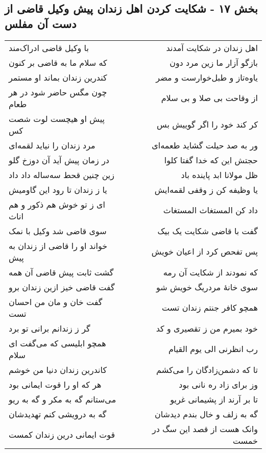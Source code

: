 \begin{center}
\section*{بخش ۱۷ - شکایت کردن اهل زندان پیش وکیل قاضی از دست آن مفلس}
\label{sec:sh017}
\begin{longtable}{l p{0.5cm} r}
با وکیل قاضی ادراک‌مند
&&
اهل زندان در شکایت آمدند
\\
که سلام ما به قاضی بر کنون
&&
بازگو آزار ما زین مرد دون
\\
کندرین زندان بماند او مستمر
&&
یاوه‌تاز و طبل‌خوارست و مضر
\\
چون مگس حاضر شود در هر طعام
&&
از وقاحت بی صلا و بی سلام
\\
پیش او هیچست لوت شصت کس
&&
کر کند خود را اگر گوییش بس
\\
مرد زندان را نیاید لقمه‌ای
&&
ور به صد حیلت گشاید طعمه‌ای
\\
در زمان پیش آید آن دوزخ گلو
&&
حجتش این که خدا گفتا کلوا
\\
زین چنین قحط سه‌ساله داد داد
&&
ظل مولانا ابد پاینده باد
\\
یا ز زندان تا رود این گاومیش
&&
یا وظیفه کن ز وقفی لقمه‌ایش
\\
ای ز تو خوش هم ذکور و هم اناث
&&
داد کن المستغاث المستغاث
\\
سوی قاضی شد وکیل با نمک
&&
گفت با قاضی شکایت یک بیک
\\
خواند او را قاضی از زندان به پیش
&&
پس تفحص کرد از اعیان خویش
\\
گشت ثابت پیش قاضی آن همه
&&
که نمودند از شکایت آن رمه
\\
گفت قاضی خیز ازین زندان برو
&&
سوی خانهٔ مردریگ خویش شو
\\
گفت خان و مان من احسان تست
&&
همچو کافر جنتم زندان تست
\\
گر ز زندانم برانی تو برد
&&
خود بمیرم من ز تقصیری و کد
\\
همچو ابلیسی که می‌گفت ای سلام
&&
رب انظرنی الی یوم القیام
\\
کاندرین زندان دنیا من خوشم
&&
تا که دشمن‌زادگان را می‌کشم
\\
هر که او را قوت ایمانی بود
&&
وز برای زاد ره نانی بود
\\
می‌ستانم گه به مکر و گه به ریو
&&
تا بر آرند از پشیمانی غریو
\\
گه به درویشی کنم تهدیدشان
&&
گه به زلف و خال بندم دیدشان
\\
قوت ایمانی درین زندان کمست
&&
وانک هست از قصد این سگ در خمست
\\

\end{longtable}
\end{center}
